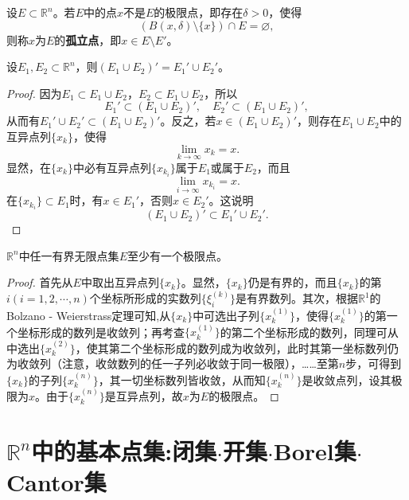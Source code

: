 \documentclass[lang=cn,newtx,10pt,scheme=chinese]{../Template/elegantbook}
\begin{document}
\begin{definition}[孤立点]\label{definition:孤立点}
  设\(E\subset\mathbb{R}^n\)。若\(E\)中的点\(x\)不是\(E\)的极限点，即存在\(\delta>0\)，使得
\[(B(x,\delta)\setminus\{x\})\cap E=\varnothing,\]
则称\(x\)为\(E\)的\textbf{孤立点}，即\(x\in E\setminus E'\)。
\end{definition}

\begin{theorem}[导集的性质]\label{theorem:导集的性质}
设\(E_1,E_2\subset\mathbb{R}^n\)，则\((E_1\cup E_2)' = E_1'\cup E_2'\)。
\end{theorem}
\begin{proof}
  因为\(E_1\subset E_1\cup E_2\)，\(E_2\subset E_1\cup E_2\)，所以
\[E_1'\subset (E_1\cup E_2)',\quad E_2'\subset (E_1\cup E_2)',\]
从而有\(E_1'\cup E_2'\subset (E_1\cup E_2)'\)。反之，若\(x\in (E_1\cup E_2)'\)，则存在\(E_1\cup E_2\)中的互异点列\(\{x_k\}\)，使得
\[\lim_{k\rightarrow\infty}x_k = x.\]
显然，在\(\{x_k\}\)中必有互异点列\(\{x_{k_i}\}\)属于\(E_1\)或属于\(E_2\)，而且
\[\lim_{i\rightarrow\infty}x_{k_i} = x.\]
在\(\{x_{k_i}\}\subset E_1\)时，有\(x\in E_1'\)，否则\(x\in E_2'\)。这说明
\[(E_1\cup E_2)'\subset E_1'\cup E_2'.\]

\end{proof}

\begin{theorem}\label{theorem:Bolzano - Weierstrass定理}
  \(\mathbb{R}^n\)中任一有界无限点集\(E\)至少有一个极限点。
\end{theorem}
\begin{proof}
  首先从\(E\)中取出互异点列\(\{x_k\}\)。显然，\(\{x_k\}\)仍是有界的，而且\(\{x_k\}\)的第\(i(i = 1,2,\cdots,n)\)个坐标所形成的实数列\(\{\xi_i^{(k)}\}\)是有界数列。其次，根据\(\mathbb{R}^1\)的Bolzano - Weierstrass定理可知,从\(\{x_k\}\)中可选出子列\(\{x_k^{(1)}\}\)，使得\(\{x_k^{(1)}\}\)的第一个坐标形成的数列是收敛列；再考查\(\{x_k^{(1)}\}\)的第二个坐标形成的数列，同理可从中选出\(\{x_k^{(2)}\}\)，使其第二个坐标形成的数列成为收敛列，此时其第一坐标数列仍为收敛列（注意，收敛数列的任一子列必收敛于同一极限），……至第\(n\)步，可得到\(\{x_k\}\)的子列\(\{x_k^{(n)}\}\)，其一切坐标数列皆收敛，从而知\(\{x_k^{(n)}\}\)是收敛点列，设其极限为\(x\)。由于\(\{x_k^{(n)}\}\)是互异点列，故\(x\)为\(E\)的极限点。

\end{proof}

\section{$\mathbb{R}^n$中的基本点集:闭集$\cdot$开集$\cdot$Borel集$\cdot$Cantor集}
\end{document}
